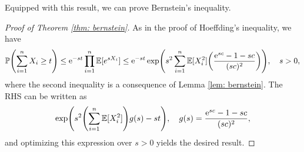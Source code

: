 Equipped with this result, we can prove Bernstein's inequality.

\begin{proof}[Proof of Theorem \ref{thm: bernstein}]
As in the proof of Hoeffding's inequality, we have
\[
    \Prob\left(\sum_{i=1}^n X_i \geq t\right) \leq \e^{-st} \prod_{i=1}^n \Exp[e^{sX_i}] \leq \e^{-st} \exp(s^2 \sum_{i=1}^n \Exp[X_i^2] \left(\frac{\e^{sc} - 1 - sc}{(sc)^2}\right)), \quad s > 0,
\]
where the second inequality is a consequence of Lemma \ref{lem: bernstein}. The RHS can be written as
\[
    \exp(s^2 \left(\sum_{i=1}^n \Exp[X_i^2]\right) g(s) - st), \quad g(s) = \frac{\e^{sc} - 1 - sc}{(sc)^2},
\]
and optimizing this expression over $s > 0$ yields the desired result.
\end{proof}
